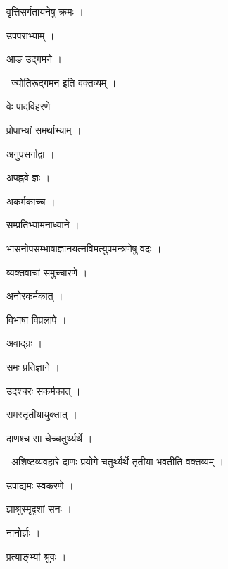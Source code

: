 \documentclass[10pt, openany, oneside]{book}
\begin{document}
\noindent वृत्तिसर्गतायनेषु क्रमः ।

\noindent उपपराभ्याम् ।

\noindent आङ उद्गमने ।

\par\noindent\hspace{1.5em}{\vps वा॰}~{\qt ज्योतिरूद्गमन इति वक्तव्यम् ।}

\noindent वेः पादविहरणे ।

\noindent प्रोपाभ्यां समर्थाभ्याम् ।

\noindent अनुपसर्गाद्वा ।

\noindent अपह्नवे ज्ञः ।

\noindent अकर्मकाच्च ।

\noindent सम्प्रतिभ्यामनाध्याने ।

\noindent भासनोपसम्भाषाज्ञानयत्नविमत्युपमन्त्रणेषु वदः ।

\noindent व्यक्तवाचां समुच्चारणे ।

\noindent अनोरकर्मकात् ।

\noindent विभाषा विप्रलापे ।

\noindent अवाद्ग्रः ।

\noindent समः प्रतिज्ञाने ।

\noindent उदश्चरः सकर्मकात् ।

\noindent समस्तृतीयायुक्तात् ।

\noindent दाणश्च सा चेच्चतुर्थ्यर्थे ।

\par\noindent\hspace{1.5em}{\vps वा॰}~{\qt अशिष्टव्यवहारे दाणः प्रयोगे चतुर्थ्यर्थे तृतीया भवतीति वक्तव्यम् ।}

\noindent उपाद्यमः स्वकरणे ।

\noindent ज्ञाश्रुस्मृदृशां सनः ।

\noindent नानोर्ज्ञः ।

\noindent प्रत्याङ्भ्यां श्रुवः ।
\end{document}
